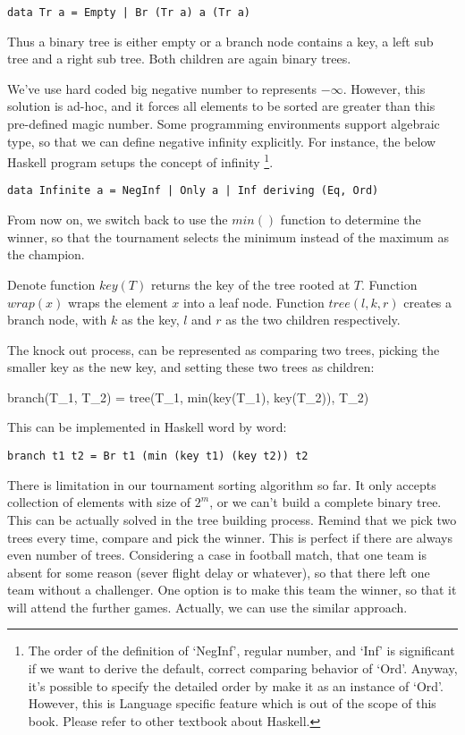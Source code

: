 \documentclass{article}
\begin{document}
\lstset{language=Haskell}
\begin{lstlisting}
data Tr a = Empty | Br (Tr a) a (Tr a)
\end{lstlisting}

Thus a binary tree is either empty or a branch node contains a key, a left sub tree and a right sub tree.
Both children are again binary trees.

We've use hard coded big negative number to represents $-\infty$. However, this solution is ad-hoc, and
it forces all elements to be sorted are greater than this pre-defined magic number. Some programming
environments support algebraic type, so that we can define negative infinity explicitly. For instance,
the below Haskell program setups the concept of infinity \footnote{The order of the definition of `NegInf',
regular number, and `Inf' is significant if we want to derive the default, correct comparing behavior of `Ord'.
Anyway, it's possible to specify the detailed order by make it as an instance of `Ord'. However, this is
Language specific feature which is out of the scope of this book. Please refer to other textbook about Haskell.}.

\lstset{language=Haskell}
\begin{lstlisting}
data Infinite a = NegInf | Only a | Inf deriving (Eq, Ord)
\end{lstlisting}

From now on, we switch back to use the $min()$ function to determine the winner, so that the tournament selects the minimum
instead of the maximum as the champion.

Denote function $key(T)$ returns the key of the tree rooted at $T$. Function $wrap(x)$ wraps the element
$x$ into a leaf node. Function $tree(l, k, r)$ creates a branch node, with $k$ as the key, $l$ and $r$
as the two children respectively.

The knock out process, can be represented as comparing two trees, picking the smaller key as the new
key, and setting these two trees as children:

\be
branch(T_1, T_2) = tree(T_1, min(key(T_1), key(T_2)), T_2)
\ee

This can be implemented in Haskell word by word:

\lstset{language=Haskell}
\begin{lstlisting}
branch t1 t2 = Br t1 (min (key t1) (key t2)) t2
\end{lstlisting}

There is limitation in our tournament sorting algorithm so far. It only accepts collection of elements
with size of $2^m$, or we can't build a complete binary tree. This can be actually solved in the tree
building process. Remind that we pick two trees every time, compare and pick the winner. This is perfect
if there are always even number of trees. Considering a case in football match, that one team is absent
for some reason (sever flight delay or whatever), so that there left one team without a challenger.
One option is to make this team the winner, so that it will attend the further games. Actually, we can
use the similar approach.
\end{document}

